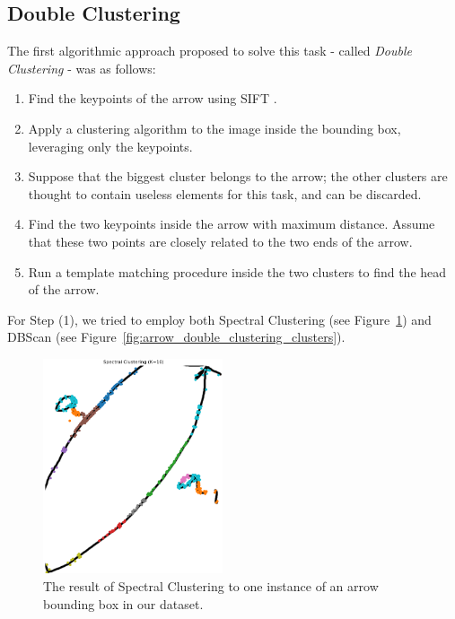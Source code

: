 \documentclass[conference]{IEEEtran}
\begin{document}
\begin{appendices}

\section{Double Clustering}
\label{double_clustering}
The first algorithmic approach proposed to solve this task - called \textit{Double Clustering} - was as follows: 
\begin{enumerate}
	\item Find the keypoints of the arrow using SIFT \cite{SIFT}.
	\item Apply a clustering algorithm to the image inside the bounding box, leveraging only the keypoints.
	\item Suppose that the biggest cluster belongs to the arrow; the other clusters are thought to contain useless elements for this task, and can be discarded.
	\item Find the two keypoints inside the arrow with maximum distance. Assume that these two points are closely related to the two ends of the arrow.
	\item Run a template matching procedure inside the two clusters to find the head of the arrow.
\end{enumerate}

For Step (1), we tried to employ both Spectral Clustering \cite{spectralclustering} (see Figure~\ref{fig:spectral_clustering}) and DBScan \cite{dbscan} (see Figure~\ref{fig:arrow_double_clustering_clusters}).

\begin{figure}[H]
	\centering
	\includegraphics[width=150pt]{spectral_clustering.png}
	\caption{The result of Spectral Clustering to one instance of an arrow bounding box in our dataset.}
	\label{fig:spectral_clustering}
\end{figure}


\end{appendices}
\end{document}
